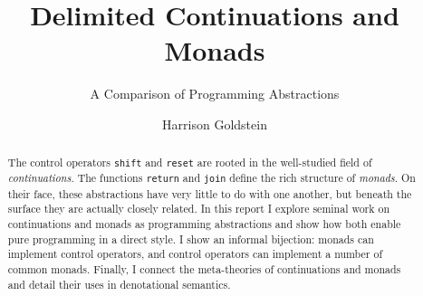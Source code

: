 \documentclass[acmsmall, nonacm]{acmart}
\begin{document}
\title{Delimited Continuations and Monads}
\subtitle{A Comparison of Programming Abstractions}

\author{Harrison Goldstein}

\renewcommand{\shortauthors}{Goldstein}

\begin{abstract}
  The control operators {\tt shift} and {\tt reset} are rooted in the well-studied field of {\em
  continuations}. The functions {\tt return} and {\tt join} define the rich structure of {\em
  monads}. On their face, these abstractions have very little to do with one another, but beneath
  the surface they are actually closely related. In this report I explore seminal work on
  continuations and monads as programming abstractions and show how both enable pure programming
  in a direct style. I show an informal bijection: monads can implement control operators, and
  control operators can implement a number of common monads. Finally, I connect the meta-theories
  of continuations and monads and detail their uses in denotational semantics.
\end{abstract}

\maketitle
\end{document}
